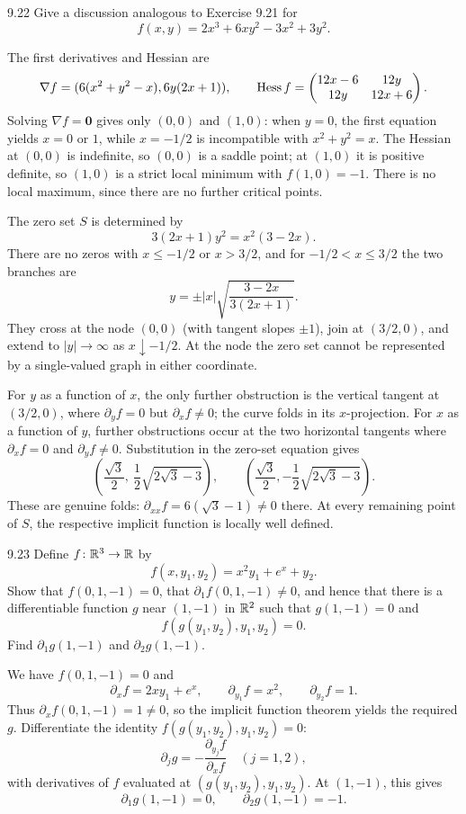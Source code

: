 \documentclass[11pt,oneside]{article}
\begin{document}
\begin{exercise}{9.22}
Give a discussion analogous to Exercise 9.21 for
\[
 f(x,y)=2x^3+6xy^2-3x^2+3y^2.
\]
\end{exercise}
\begin{solution}
The first derivatives and Hessian are
\[
 \nabla f=(6(x^2+y^2-x),6y(2x+1)),\qquad
 \operatorname{Hess} f=\begin{pmatrix}12x-6&12y\\12y&12x+6\end{pmatrix}.
\]
Solving $\nabla f=\mathbf0$ gives only $(0,0)$ and $(1,0)$: when $y=0$, the first equation yields $x=0$ or $1$, while $x=-1/2$ is incompatible with $x^2+y^2=x$. The Hessian at $(0,0)$ is indefinite, so $(0,0)$ is a saddle point; at $(1,0)$ it is positive definite, so $(1,0)$ is a strict local minimum with $f(1,0)=-1$. There is no local maximum, since there are no further critical points.

The zero set $S$ is determined by
\[
 3(2x+1)y^2=x^2(3-2x).
\]
There are no zeros with $x\le-1/2$ or $x>3/2$, and for $-1/2<x\le3/2$ the two branches are
\[
 y=\pm |x|\sqrt{\frac{3-2x}{3(2x+1)}}.
\]
They cross at the node $(0,0)$ (with tangent slopes $\pm1$), join at $(3/2,0)$, and extend to $|y|\to\infty$ as $x\downarrow-1/2$. At the node the zero set cannot be represented by a single-valued graph in either coordinate.

For $y$ as a function of $x$, the only further obstruction is the vertical tangent at $(3/2,0)$, where $\partial_yf=0$ but $\partial_xf\ne0$; the curve folds in its $x$-projection.
For $x$ as a function of $y$, further obstructions occur at the two horizontal tangents where $\partial_xf=0$ and $\partial_yf\ne0$. Substitution in the zero-set equation gives
\[
 \left(\frac{\sqrt3}{2},\ \frac12\sqrt{2\sqrt3-3}\right),\qquad
 \left(\frac{\sqrt3}{2},-\frac12\sqrt{2\sqrt3-3}\right).
\]
These are genuine folds: $\partial_{xx}f=6(\sqrt3-1)\ne0$ there. At every remaining point of $S$, the respective implicit function is locally well defined.
\end{solution}

\begin{exercise}{9.23}
Define $f\colon\mathbb{R}^3\to\mathbb{R}$ by
\[
 f(x,y_1,y_2)=x^2y_1+e^x+y_2.
\]
Show that $f(0,1,-1)=0$, that $\partial_1f(0,1,-1)\ne0$, and hence that there is a differentiable function $g$ near $(1,-1)$ in $\mathbb{R}^2$ such that $g(1,-1)=0$ and
\[
 f(g(y_1,y_2),y_1,y_2)=0.
\]
Find $\partial_1g(1,-1)$ and $\partial_2g(1,-1)$.
\end{exercise}
\begin{solution}
We have $f(0,1,-1)=0$ and
\[
 \partial_xf=2xy_1+e^x,\qquad
 \partial_{y_1}f=x^2,\qquad \partial_{y_2}f=1.
\]
Thus $\partial_xf(0,1,-1)=1\ne0$, so the implicit function theorem yields the required $g$. Differentiate the identity $f(g(y_1,y_2),y_1,y_2)=0$:
\[
 \partial_jg=-\frac{\partial_{y_j}f}{\partial_xf}
 \quad(j=1,2),
\]
with derivatives of $f$ evaluated at $(g(y_1,y_2),y_1,y_2)$. At $(1,-1)$, this gives
\[
 \boxed{\partial_1g(1,-1)=0,\qquad\partial_2g(1,-1)=-1.}
\]
\end{solution}
\end{document}
